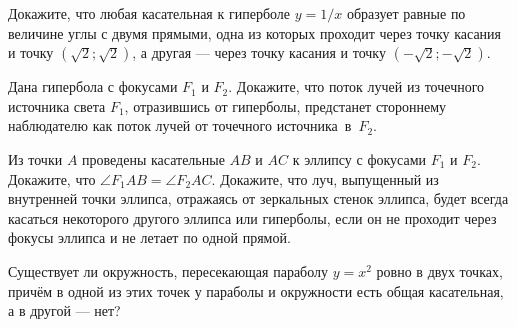 \documentclass[a4paper,12pt]{article}
\begin{document}
Докажите, что любая касательная к гиперболе $y=1/x$ образует равные
по величине углы с двумя прямыми, одна из которых проходит через
точку касания и точку $(\sqrt2;\sqrt2)$, а другая ---  через
точку касания и точку $(-\sqrt2;-\sqrt2)$.

Дана гипербола с фокусами $F_1$ и $F_2$.
Докажите, что поток лучей из точечного источника света $F_1$, отразившись
от гиперболы, предстанет стороннему наблюдателю как поток лучей от точечного
источника~в~$F_2$.

 Из точки $A$ проведены касательные $AB$ и $AC$ к эллипсу с фокусами $F_1$ и $F_2$. Докажите, что $\angle F_1AB=\angle F_2AC.$
 Докажите, что луч, выпущенный из внутренней точки эллипса, отражаясь от зеркальных стенок эллипса, будет всегда касаться некоторого другого эллипса или гиперболы, если он не проходит через фокусы эллипса и не летает по одной прямой.


Существует ли окружность, %
пересекающая параболу $y=x^2$ ровно в двух точках,
прич\"ем в одной из этих точек у параболы и окружности есть общая
касательная, а в другой --- нет?




\end{document}

